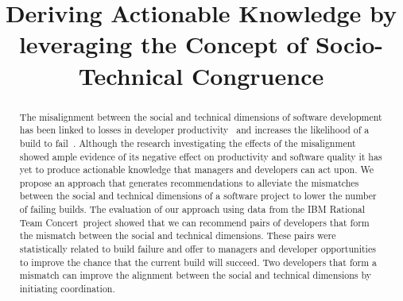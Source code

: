 \documentclass[conference]{IEEEtran}
\begin{document}
\title{Deriving Actionable Knowledge by leveraging the Concept of Socio-Technical Congruence}



\author{
\and
{}
}

\maketitle

\begin{abstract}
The misalignment between the social and technical dimensions of software development has been
linked to losses in developer productivity~\cite{cataldo:esem:2008} and increases the likelihood of a build to fail~\cite{kwan:tse:2011}.
Although the research investigating the effects of the misalignment showed ample evidence of its negative effect on productivity and software quality it has yet to produce actionable knowledge that managers and developers can act upon.
We propose an approach that generates recommendations to alleviate the mismatches between the social and technical dimensions of a software project to lower the number of failing builds.
The evaluation of our approach using data from the IBM Rational Team Concert\texttrademark\ project showed that we can recommend pairs of developers that form the mismatch between the social and technical dimensions.
These pairs were statistically related to build failure and offer to managers and developer opportunities to improve the chance that the current build will succeed.
Two developers that form a mismatch can improve the alignment between the social and technical dimensions by initiating coordination.
%
%
%
\end{abstract}
\end{document}
